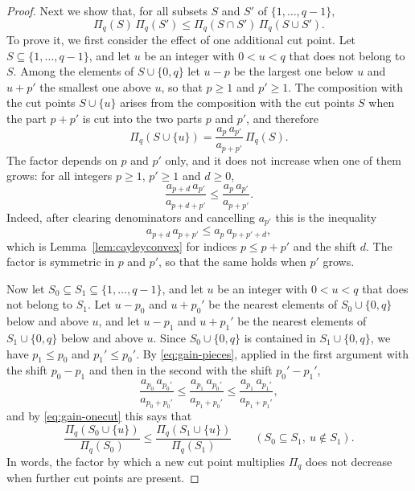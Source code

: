 \documentclass{amsart}
\theoremstyle{definition}
\theoremstyle{remark}
\numberwithin{equation}{section}
\begin{document}
\begin{proof}
Next we show that, for all subsets $S$ and $S'$ of $\{1,\dots,q-1\}$,
\begin{equation}\label{eq:gain-supermodular}
\Pi_q(S)\,\Pi_q(S')\le\Pi_q(S\cap S')\,\Pi_q(S\cup S').
\end{equation}
To prove it, we first consider the effect of one additional cut point. Let
$S\subseteq\{1,\dots,q-1\}$, and let $u$ be an integer with $0<u<q$ that does
not belong to $S$. Among the elements of $S\cup\{0,q\}$ let $u-p$ be the
largest one below $u$ and $u+p'$ the smallest one above $u$, so that $p\ge1$
and $p'\ge1$. The composition with the cut points $S\cup\{u\}$ arises from the
composition with the cut points $S$ when the part $p+p'$ is cut into the two
parts $p$ and $p'$, and therefore
\begin{equation}\label{eq:gain-onecut}
\Pi_q(S\cup\{u\})=\frac{a_p\,a_{p'}}{a_{p+p'}}\,\Pi_q(S).
\end{equation}
The factor depends on $p$ and $p'$ only, and it does not increase when one
of them grows: for all integers $p\ge1$, $p'\ge1$ and $d\ge0$,
\begin{equation}\label{eq:gain-pieces}
\frac{a_{p+d}\,a_{p'}}{a_{p+d+p'}}\le\frac{a_p\,a_{p'}}{a_{p+p'}}.
\end{equation}
Indeed, after clearing denominators and cancelling $a_{p'}$ this is the
inequality
\[
a_{p+d}\,a_{p+p'}\le a_p\,a_{p+p'+d},
\]
which is Lemma~\ref{lem:cayleyconvex} for indices $p\le p+p'$ and the shift
$d$. The factor is symmetric in $p$ and $p'$, so that the same holds when $p'$
grows.

Now let $S_0\subseteq S_1\subseteq\{1,\dots,q-1\}$, and let $u$ be an integer
with $0<u<q$ that does not belong to $S_1$. Let $u-p_0$ and $u+p_0'$ be the
nearest elements of $S_0\cup\{0,q\}$ below and above $u$, and let $u-p_1$
and $u+p_1'$ be the nearest elements of $S_1\cup\{0,q\}$ below and above
$u$. Since $S_0\cup\{0,q\}$ is contained in
$S_1\cup\{0,q\}$, we have $p_1\le p_0$ and $p_1'\le p_0'$. By
\eqref{eq:gain-pieces}, applied in the first argument with the shift
$p_0-p_1$ and then in the second with the shift $p_0'-p_1'$,
\[
\frac{a_{p_0}\,a_{p_0'}}{a_{p_0+p_0'}}
\le\frac{a_{p_1}\,a_{p_0'}}{a_{p_1+p_0'}}
\le\frac{a_{p_1}\,a_{p_1'}}{a_{p_1+p_1'}},
\]
and by \eqref{eq:gain-onecut} this says that
\begin{equation}\label{eq:gain-increment}
\frac{\Pi_q(S_0\cup\{u\})}{\Pi_q(S_0)}\le\frac{\Pi_q(S_1\cup\{u\})}{\Pi_q(S_1)}
\qquad(S_0\subseteq S_1,\ u\notin S_1).
\end{equation}
In words, the factor by which a new cut point multiplies $\Pi_q$ does not
decrease when further cut points are present.


\end{proof}
\end{document}
